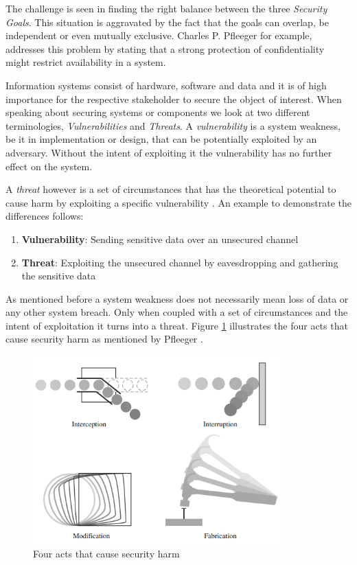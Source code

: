 The challenge is seen in finding the right balance between the three \textit{Security Goals}. This situation is aggravated by the fact that the goals can overlap, be independent or even mutually exclusive. Charles P. Pfleeger \cite{Pfleeger:2006:SC:1177321} for example, addresses this problem by stating that a strong protection of confidentiality might restrict availability in a system.   

Information systems consist of hardware, software and data and it is of high importance for the respective stakeholder to secure the object of interest. When speaking about securing systems or components we look at two different terminologies, \textit{Vulnerabilities} and \textit{Threats}. A \textit{vulnerability} is a system weakness, be it in implementation or design, that can be potentially exploited by an adversary. Without the intent of exploiting it the vulnerability has no further effect on the system.

A \textit{threat} however is a set of circumstances that has the theoretical potential to cause harm by exploiting a specific vulnerability \cite{vacca2012computer}. An example to demonstrate the differences follows:

\begin{enumerate}[label=\textbf{Def.\arabic*}]
\item \textbf{Vulnerability}: Sending sensitive data over an unsecured channel \label{item:vuln}
\item \textbf{Threat}: Exploiting the unsecured channel by eavesdropping and gathering the sensitive data 
\end{enumerate}

As mentioned before a system weakness does not necessarily mean loss of data or any other system breach. Only when coupled with a set of circumstances and the intent of exploitation it turns into a threat. Figure \ref{fig:threats} illustrates the four acts that cause security harm as mentioned by Pfleeger \cite{Pfleeger:2006:SC:1177321}. 

\begin{figure}[H]
\centering
\includegraphics[width=0.85\textwidth]{pictures/threats.png}
\caption{Four acts that cause security harm}
\label{fig:threats}
\end{figure}

